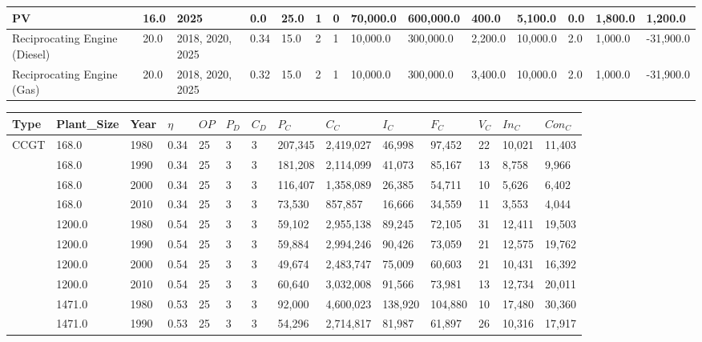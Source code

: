 \begin{table*}[]
\begin{tabularx}{\linewidth}{|p{}|l|x|l|l|l|l|l|l|l|l|l|l|l|}
PV                            & 16.0        & 2025             & 0.0    & 25.0 & 1     & 0     & 70,000.0  & 600,000.0   & 400.0     & 5,100.0  & 0.0   & 1,800.0  & 1,200.0   \\ \hline
Reciprocating Engine (Diesel) & 20.0        & 2018, 2020, 2025 & 0.34   & 15.0 & 2     & 1     & 10,000.0  & 300,000.0   & 2,200.0   & 10,000.0 & 2.0   & 1,000.0  & -31,900.0 \\ \hline
Reciprocating Engine (Gas)    & 20.0        & 2018, 2020, 2025 & 0.32   & 15.0 & 2     & 1     & 10,000.0  & 300,000.0   & 3,400.0   & 10,000.0 & 2.0   & 1,000.0  & -31,900.0 \\ \hline
	\end{tabularx}
\end{table*}


\begin{table}[]
	\begin{tabular}{|l|l|l|l|l|l|l|l|l|l|l|l|l|l|}
		\hline
		Type & Plant\_Size & Year & $\eta$ & $OP$ & $P_D$ & $C_D$ & $P_C$ & $C_C$ & $I_C$ & $F_C$ & $V_C$ & $In_C$ & $Con_C$ \\ \hline
		\multirow{12}{*}{CCGT} & 168.0 & 1980 & 0.34 & 25 & 3 & 3 & 207,345 & 2,419,027 & 46,998 & 97,452 & 22 & 10,021 & 11,403 \\ \cline{2-14} 
		& 168.0 & 1990 & 0.34 & 25 & 3 & 3 & 181,208 & 2,114,099 & 41,073 & 85,167 & 13 & 8,758 & 9,966 \\ \cline{2-14} 
		& 168.0 & 2000 & 0.34 & 25 & 3 & 3 & 116,407 & 1,358,089 & 26,385 & 54,711 & 10 & 5,626 & 6,402 \\ \cline{2-14} 
		& 168.0 & 2010 & 0.34 & 25 & 3 & 3 & 73,530 & 857,857 & 16,666 & 34,559 & 11 & 3,553 & 4,044 \\ \cline{2-14} 
		& 1200.0 & 1980 & 0.54 & 25 & 3 & 3 & 59,102 & 2,955,138 & 89,245 & 72,105 & 31 & 12,411 & 19,503 \\ \cline{2-14} 
		& 1200.0 & 1990 & 0.54 & 25 & 3 & 3 & 59,884 & 2,994,246 & 90,426 & 73,059 & 21 & 12,575 & 19,762 \\ \cline{2-14} 
		& 1200.0 & 2000 & 0.54 & 25 & 3 & 3 & 49,674 & 2,483,747 & 75,009 & 60,603 & 21 & 10,431 & 16,392 \\ \cline{2-14} 
		& 1200.0 & 2010 & 0.54 & 25 & 3 & 3 & 60,640 & 3,032,008 & 91,566 & 73,981 & 13 & 12,734 & 20,011 \\ \cline{2-14} 
		& 1471.0 & 1980 & 0.53 & 25 & 3 & 3 & 92,000 & 4,600,023 & 138,920 & 104,880 & 10 & 17,480 & 30,360 \\ \cline{2-14} 
		& 1471.0 & 1990 & 0.53 & 25 & 3 & 3 & 54,296 & 2,714,817 & 81,987 & 61,897 & 26 & 10,316 & 17,917 \\ \cline{2-14} 

\end{tabular}
\end{table}
